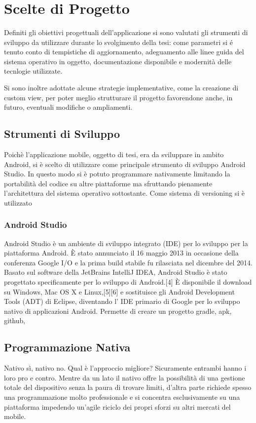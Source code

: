 \documentclass{article}
\begin{document}
  \section{Scelte di Progetto}
  \paragraph{}
Definiti gli obiettivi progettuali dell'applicazione si sono valutati gli strumenti di sviluppo da utilizzare durante lo svolgimento della tesi: come parametri si é tenuto conto di tempistiche di aggiornamento, adeguamento alle linee guida del sistema operativo in oggetto, documentazione disponibile e modernità delle tecnlogie utilizzate.

Si sono inoltre adottate alcune strategie implementative, come la creazione di custom view, per poter meglio strutturare il progetto favorendone anche, in futuro, eventuali modifiche o ampliamenti.

\subsection{Strumenti di Sviluppo}

Poichè l'applicazione mobile, oggetto di tesi, era da sviluppare in ambito Android, si è scelto di utilizzare come principale strumento di sviluppo Android Studio.
In questo modo si è potuto programmare nativamente limitando la portabilità del codice su altre piattaforme ma sfruttando pienamente l'architettura del sistema operativo sottostante.
Come sistema di versioning si è utilizzato 


\subsubsection{Android Studio}

Android Studio \cite{HTMLIT:1} è un ambiente di sviluppo integrato (IDE) per lo sviluppo per la piattaforma Android. È stato annunciato il 16 maggio 2013 in occasione della conferenza Google I/O e la prima build stabile fu rilasciata nel dicembre del 2014.
Basato sul software della JetBrains IntelliJ IDEA, Android Studio è stato progettato specificamente per lo sviluppo di Android.[4] È disponibile il download su Windows, Mac OS X e Linux,[5][6] e sostituisce gli Android Development Tools (ADT) di Eclipse, diventando l' IDE primario di Google per lo sviluppo nativo di applicazioni Android.
Permette di creare un progetto gradle, apk, github, 

\subsection{Programmazione Nativa}
Nativo sì, nativo no. Qual è l’approccio migliore? Sicuramente entrambi hanno i loro pro e contro. Mentre da un lato il nativo offre la possibilità di una gestione totale del dispositivo senza la paura di trovare limiti, d’altra parte richiede spesso una programmazione molto professionale e si concentra esclusivamente su una piattaforma impedendo un’agile riciclo dei propri sforzi su altri mercati del mobile.
\end{document}
